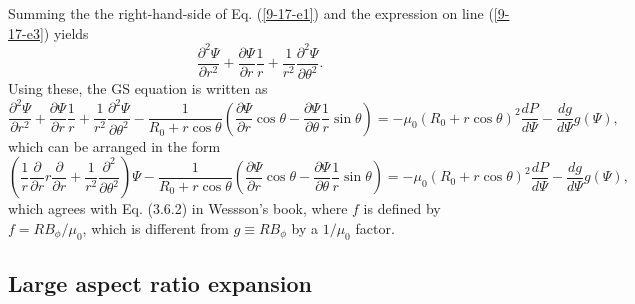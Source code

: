 \documentclass{article}
\begin{document}
Summing the the right-hand-side of Eq. (\ref{9-17-e1}) and the expression on
line (\ref{9-17-e3}) yields
\begin{equation}
  \frac{\partial^2 \Psi}{\partial r^2} + \frac{\partial \Psi}{\partial r} 
  \frac{1}{r} + \frac{1}{r^2} \frac{\partial^2 \Psi}{\partial \theta^2} .
\end{equation}
Using these, the GS equation is written as
\[ \frac{\partial^2 \Psi}{\partial r^2} + \frac{\partial \Psi}{\partial r} 
   \frac{1}{r} + \frac{1}{r^2} \frac{\partial^2 \Psi}{\partial \theta^2} -
   \frac{1}{R_0 + r \cos \theta} \left( \frac{\partial \Psi}{\partial r} \cos
   \theta - \frac{\partial \Psi}{\partial \theta}  \frac{1}{r} \sin \theta
   \right) = - \mu_0 (R_0 + r \cos \theta)^2 \frac{d P}{d \Psi} - \frac{d g}{d
   \Psi} g (\Psi), \]
which can be arranged in the form
\begin{equation}
  \label{9-17-e5} \left( \frac{1}{r}  \frac{\partial}{\partial r} r
  \frac{\partial}{\partial r} + \frac{1}{r^2}  \frac{\partial^2}{\partial
  \theta^2} \right) \Psi - \frac{1}{R_0 + r \cos \theta} \left( \frac{\partial
  \Psi}{\partial r} \cos \theta - \frac{\partial \Psi}{\partial \theta} 
  \frac{1}{r} \sin \theta \right) = - \mu_0 (R_0 + r \cos \theta)^2 \frac{d
  P}{d \Psi} - \frac{d g}{d \Psi} g (\Psi),
\end{equation}
which agrees with Eq. (3.6.2) in Wessson's book{\cite{wesson2004}}, where $f$
is defined by $f = R B_{\phi} / \mu_0$, which is different from $g \equiv R
B_{\phi}$ by a $1 / \mu_0$ factor.

\subsection{Large aspect ratio expansion}
\end{document}
